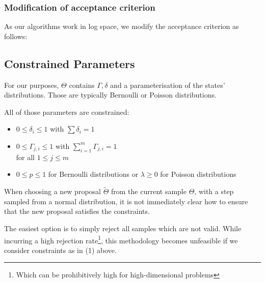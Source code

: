 \subsubsection{Modification of acceptance criterion}
As our algorithms work in log space, we modify the acceptance criterion as follows:

\subsection{Constrained Parameters}
For our purposes, $\Theta$ contains $\Gamma, \delta$ and a parameterisation of the states' distributions. Those are typically Bernoulli or Poisson distributions. 

All of those parameters are constrained:
\begin{itemize}
	\item $0 \leq \delta_i \leq 1$ with $\sum \delta_i = 1$ \\
	\item $0 \leq \Gamma_{j, i} \leq 1$ with $ \sum\limits_{i=1}^m \Gamma_{j, i} = 1$ \\
		for all $ 1 \leq j \leq m$
	\item $ 0 \leq p \leq 1$ for Bernoulli distributions or $\lambda \geq 0$ for Poisson distributions
\end{itemize}

When choosing a new proposal $\tilde{\Theta}$ from the current sample $\Theta$, with a step sampled from a normal distribution, it is not immediately clear how to ensure that the new proposal satisfies the constraints. 

The easiest option is to simply reject all samples which are not valid. While incurring a high rejection rate\footnote{Which can be prohibitively high for high-dimensional problems}, this methodology becomes unfeasible if we consider constraints as in (1) above. 


